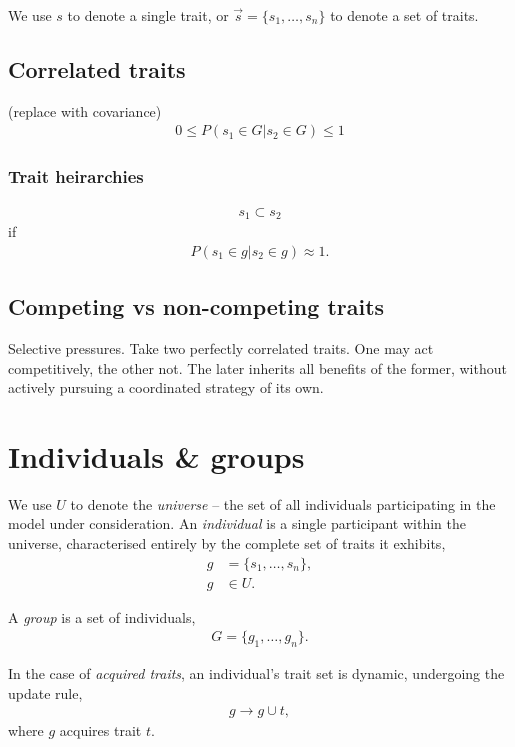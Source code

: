 \documentclass[twocolumn, aps, rmp, amsmath, amssymb, nofootinbib, superscriptaddress, longbibliography, floatfix, table-of-contents, eqsecnum]{revtex4-1}
\begin{document}
We use $s$ to denote a single trait, or $\vec s=\{s_1,\dots,s_n\}$ to denote a set of traits.

\subsection{Correlated traits}

(replace with covariance)
\begin{align}
0\leq P(s_1\in G | s_2\in G)\leq 1	
\end{align}

\subsubsection{Trait heirarchies}

\begin{align}
s_1 \subset s_2	
\end{align}
if
\begin{align}
P(s_1\in g | s_2\in g)\approx 1.	
\end{align}

\subsection{Competing vs non-competing traits}

Selective pressures. Take two perfectly correlated traits. One may act competitively, the other not. The later inherits all benefits of the former, without actively pursuing a coordinated strategy of its own.

\section{Individuals \& groups}

We use $U$ to denote the \textit{universe} -- the set of all individuals participating in the model under consideration. An \textit{individual} is a single participant within the universe, characterised entirely by the complete set of traits it exhibits,
\begin{align}
	g &= \{s_1,\dots,s_n\},\nonumber\\
	g &\in U.
\end{align}

A \textit{group} is a set of individuals,
\begin{align}
	G = \{g_1,\dots,g_n\}.	
\end{align}

In the case of \textit{acquired traits}, an individual's trait set is dynamic, undergoing the update rule,
\begin{align}
	g\to g\cup t,	
\end{align}
where $g$ acquires trait $t$.
\end{document}
